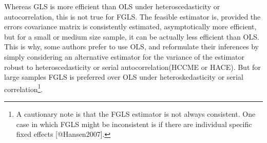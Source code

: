 \documentclass[
  12pt,
]{article}
\begin{document}
Whereas GLS is more efficient than OLS under heteroscedasticity or autocorrelation, this is not true for FGLS. The feasible estimator is, provided the errors covariance matrix is consistently estimated, asymptotically more efficient, but for a small or medium size sample, it can be actually less efficient than OLS. This is why, some authors prefer to use OLS, and reformulate their inferences by simply considering an alternative estimator for the variance of the estimator robust to heteroscedasticity or serial autocorrelation(HCCME or HACE). But for large samples FGLS is preferred over OLS under heteroskedasticity or serial correlation\footnote{A cautionary note is that the FGLS estimator is not always {\color{red} consistent}. One case in which FGLS might be inconsistent is if there are individual specific fixed effects [@Hansen2007].}.
\end{document}

